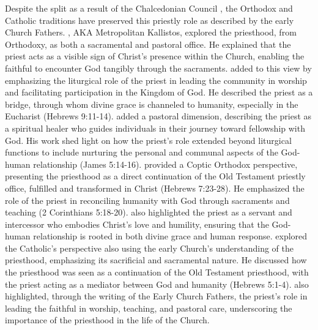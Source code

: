\documentclass[12pt,doc]{apa7}   	%
\begin{document}
Despite the split as a result of the Chalcedonian Council \citep{early_church_akin}, the Orthodox and Catholic traditions have preserved this priestly role as described by the early Church Fathers.  \citet{orthodox_church_ware}, AKA Metropolitan Kallistos, explored the priesthood, from Orthodoxy, as both a sacramental and pastoral office. He explained that the priest acts as a visible sign of Christ’s presence within the Church, enabling the faithful to encounter God tangibly through the sacraments. \citet{eucharist_schmemann} added to this view by emphasizing the liturgical role of the priest in leading the community in worship and facilitating participation in the Kingdom of God. He described the priest as a bridge, through whom divine grace is channeled to humanity, especially in the Eucharist (Hebrews 9:11-14). \citet{priests_zacharias} added a pastoral dimension, describing the priest as a spiritual healer who guides individuals in their journey toward fellowship with God. His work shed light on how the priest’s role extended beyond liturgical functions to include nurturing the personal and communal aspects of the God-human relationship (James 5:14-16).  \cite{priesthood_shenouda} provided a Coptic Orthodox perspective, presenting the priesthood as a direct continuation of the Old Testament priestly office, fulfilled and transformed in Christ (Hebrews 7:23-28). He emphasized the role of the priest in reconciling humanity with God through sacraments and teaching (2 Corinthians 5:18-20). \citeauthor{priesthood_shenouda} also highlighted the priest as a servant and intercessor who embodies Christ’s love and humility, ensuring that the God-human relationship is rooted in both divine grace and human response.  \citet{early_church_akin} explored the Catholic's perspective also using the early Church’s understanding of the priesthood, emphasizing its sacrificial and sacramental nature. He discussed how the priesthood was seen as a continuation of the Old Testament priesthood, with the priest acting as a mediator between God and humanity (Hebrews 5:1-4). \citeauthor{early_church_akin} also highlighted, through the writing of the Early Church Fathers, the priest’s role in leading the faithful in worship, teaching, and pastoral care, underscoring the importance of the priesthood in the life of the Church.
\end{document}
